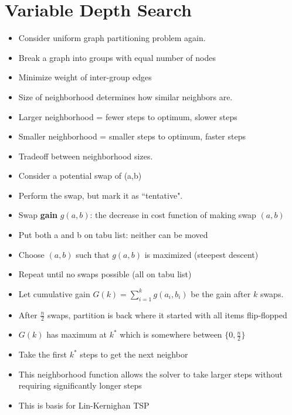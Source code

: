 \documentclass[12pt, letter]{article}
\begin{document}
\section{Variable Depth Search}%
\label{sec:variable_depth_search}
\begin{itemize}
	\item Consider uniform graph partitioning problem again.
	\item Break a graph into groups with equal number of nodes
	\item Minimize weight of inter-group edges
	\item Size of neighborhood determines how similar neighbors are.
	\item Larger neighborhood = fewer steps to optimum, slower steps
	\item Smaller neighborhood = smaller steps to optimum, faster steps
	\item Tradeoff between neighborhood sizes.
	\item Consider a potential swap of (a,b)
	\item Perform the swap, but mark it as ``tentative".
	\item Swap \textbf{gain} $g(a,b)$: the decrease in cost function of making swap $(a,b)$
	\item Put both a and b on tabu list: neither can be moved
	\item Choose $(a,b)$ such that $g(a,b)$ is maximized (steepest descent)
	\item Repeat until no swaps possible (all on tabu list)
	\item Let cumulative gain $G(k) = \sum_{i=1}^{k} g(a_i,b_i)$ be the gain after $k$ swaps.
	\item After $\frac{n}{2}$ swaps, partition is back where it started with all items flip-flopped
	\item $G(k)$ has maximum at $k^{*}$ which is somewhere between $\{0,\frac{n}{2}\}$
	\item Take the first $k^{*}$ steps to get the next neighbor
	\item This neighborhood function allows the solver to take larger steps without requiring significantly longer steps
	\item This is basis for Lin-Kernighan TSP
\end{itemize}
\end{document}
